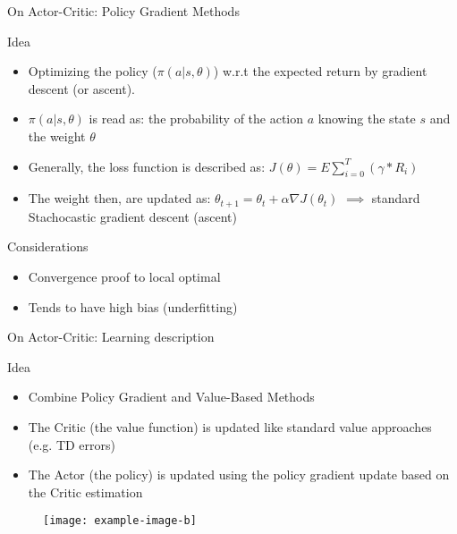 \documentclass[presentation]{beamer}\mode<presentation>{\usetheme{AMSBolognaFC}}
\begin{document}
\begin{frame}{On Actor-Critic: Policy Gradient Methods}

	\begin{alertblock}{Idea}
		\begin{itemize}
			\item Optimizing the policy ($ \pi(a | s, \theta) $) w.r.t the expected return by gradient descent (or ascent).
			\item $\pi(a | s, \theta)$ is read as: the probability of the action $a$ knowing the state $s$ and the weight $\theta$
			\item Generally, the loss function is described as: $J(\theta) = E{\sum_{i = 0}^T}(\gamma * R_i)$
			\item The weight then, are updated as: $ \theta_{t+1} = \theta_t + \alpha \nabla J(\theta_t) $ $\implies$ standard Stachocastic gradient descent (ascent)
		\end{itemize}
	\end{alertblock}

	\begin{exampleblock}{Considerations}
		\begin{itemize}
			\item[{\color{teal} \faThumbsUp}] Convergence proof to local optimal
			\item[{\color{red}} \faThumbsDown] Tends to have high bias (underfitting)
		\end{itemize}
	\end{exampleblock}
\end{frame}

\begin{frame}{On Actor-Critic: Learning description}
	\begin{alertblock}{Idea}
		\begin{itemize}
			\item Combine Policy Gradient and Value-Based Methods
			\item The Critic (the value function) is updated like standard value approaches (e.g. TD errors)
			\item The Actor (the policy) is updated using the policy gradient update based on the Critic estimation
		\end{itemize}
	\end{alertblock}
	\begin{figure}
		\texttt{[image: example-image-b]}
	\end{figure}
\end{frame}
\end{document}
